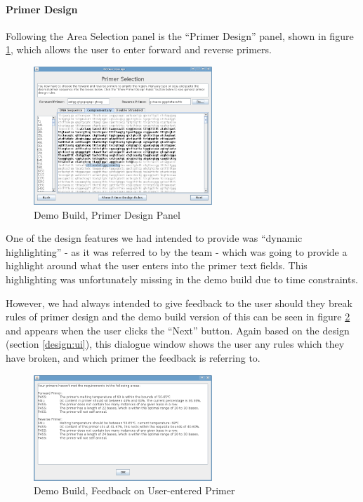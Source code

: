 
\paragraph{Primer Design}

Following the Area Selection panel is the ``Primer Design'' panel,
shown in figure \ref{fig:demoBuild:primerDesign}, which allows the
user to enter forward and reverse primers.

\begin{figure}[h]
  \begin{center}
    \includegraphics[width=0.6\textwidth]{./images/demoBuild/primerDesign.png}
    \caption{
      \label{fig:demoBuild:primerDesign}
      Demo Build, Primer Design Panel
    }
  \end{center}
\end{figure}

One of the design features we had intended to provide was ``dynamic
highlighting'' - as it was referred to by the team - which was going to
provide a highlight around what the user enters into the primer text
fields.
This highlighting was unfortunately missing in the demo build due to
time constraints.

However, we had always intended to give feedback to the user should
they break rules of primer design and the demo build version of this
can be seen in figure \ref{fig:demoBuild:primerFeedback} and appears
when the user clicks the ``Next'' button.
Again based on the design (section \ref{design:ui}), this dialogue
window shows the user any rules which they have broken, and which
primer the feedback is referring to.

\begin{figure}[h]
  \begin{center}
    \includegraphics[width=0.6\textwidth]{./images/demoBuild/primerFeedback.png}
    \caption{
      \label{fig:demoBuild:primerFeedback}
      Demo Build, Feedback on User-entered Primer
    }
  \end{center}
\end{figure}

